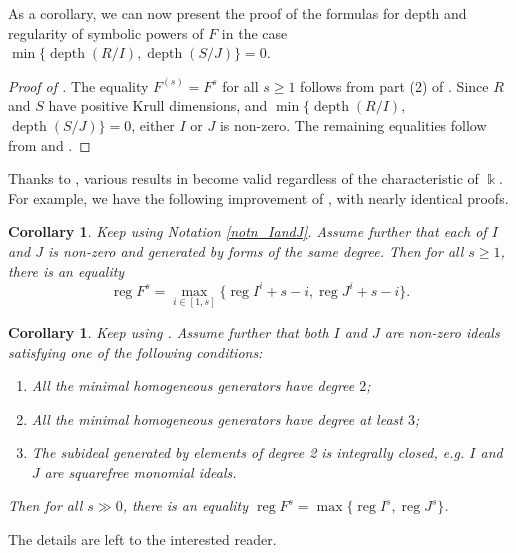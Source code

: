 \documentclass{amsart}
\DeclareMathOperator{\depth}{depth}
\DeclareMathOperator{\reg}{reg}
\theoremstyle{plain}
\newtheorem{cor}[thm]{Corollary}
\theoremstyle{definition}
\numberwithin{equation}{section}
\newcommand{\kk}{\Bbbk}
\begin{document}
As a corollary, we can now present the proof of the formulas for depth and regularity of symbolic powers of $F$ in the case $\min\{\depth(R/I),\depth(S/J)\}=0$.
\begin{proof}[Proof of ]
The equality $F^{(s)}=F^s$ for all $s\ge 1$ follows from part (2) of . Since $R$ and $S$ have positive Krull dimensions, and  $\min\{\depth(R/I),$ $\depth(S/J)\}=0$, either $I$ or $J$ is non-zero. The remaining equalities follow from  and .
\end{proof}
Thanks to , various results in \cite{NgV19b} become valid regardless of the characteristic of $\kk$. For example, we have the following improvement of \cite[Corollaries 5.2 and 5.6]{NgV19b}, with nearly identical proofs.
\begin{cor}
\label{cor_reg_equigen}
Keep using Notation \ref{notn_IandJ}. Assume further that each of $I$ and $J$ is non-zero and generated by forms of the same degree. Then for all $s\ge 1$, there is an equality
\[
\reg F^s=\max_{i\in [1,s]}\bigl\{\reg I^i+s-i, \reg J^i+s-i\bigr\}.
\]
\end{cor}


\begin{cor}
\label{cor_asymptotic_regordpower}
Keep using . Assume further that both $I$ and $J$ are non-zero ideals satisfying one of the following conditions: 
\begin{enumerate}[\quad \rm (i)]
\item All the minimal homogeneous generators have degree $2$;
\item All the minimal homogeneous generators have degree at least $3$;
\item The subideal generated by elements of degree 2 is integrally closed, e.g. $I$ and $J$ are squarefree monomial ideals.
\end{enumerate}
Then for all $s\gg 0$, there is an equality $\reg F^s=\max\{\reg I^s,\reg J^s\}$.
\end{cor}
The details are left to the interested reader.


\end{document}
